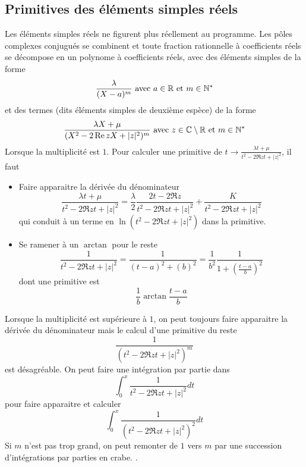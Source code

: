 \subsection{Primitives des éléments simples réels}
Les éléments simples réels ne figurent plus réellement au programme. Les pôles complexes conjugués se combinent et toute fraction rationnelle à coefficients réels se décompose en un polynome à coefficients réels, avec des éléments simples de la forme
\begin{displaymath}
 \frac{\lambda}{(X-a)^m} \text{ avec } a\in \mathbb{R} \text{ et } m\in \mathbb{N}^*
\end{displaymath}
et des termes (dits éléments simples de deuxième espèce) de la forme
\begin{displaymath}
 \frac{\lambda X + \mu }{(X^2-2\mathop{\mathrm{Re}} z X +|z|^2)^m} \text{ avec } z\in\mathbb{C}\setminus \mathbb{R} \text{ et } m\in \mathbb{N}^*
\end{displaymath}
Lorsque la multiplicité est $1$. Pour calculer une primitive de $t\rightarrow \frac{\lambda t + \mu }{t^2-2\Re z t +|z|^2}$, il faut
\begin{itemize}
 \item Faire apparaitre la dérivée du dénominateur
\begin{displaymath}
 \frac{\lambda t + \mu }{t^2-2\Re z t +|z|^2} 
= \frac{\lambda}{2} \frac{2 t -2\Re z }{t^2-2\Re z t +|z|^2}
  + \frac{K }{t^2-2\Re z t +|z|^2} 
\end{displaymath}
qui conduit à un terme en $\ln(t^2-2\Re z t +|z|^2)$ dans la primitive.
\item Se ramener à un $\arctan$ pour le reste 
\begin{displaymath}
 \frac{1}{t^2-2\Re z t +|z|^2} = \frac{1 }{(t-a)^2 +(b)^2}
=\frac{1}{b^2} \frac{1 }{1+ \left( \frac{t-a}{b}\right) ^2}
\end{displaymath}
dont une primitive est
\begin{displaymath}
 \frac{1}{b}\arctan \frac{t-a}{b}
\end{displaymath}
\end{itemize}
Lorsque la multiplicité est supérieure à $1$, on peut toujours faire apparaitre la dérivée du dénominateur mais le calcul d'une primitive du reste
\begin{displaymath}
 \frac{1 }{(t^2-2\Re z t +|z|^2)^m}
\end{displaymath}
est désagréable. On peut faire une intégration par partie dans 
\begin{displaymath}
 \int_0^x \frac{1 }{t^2-2\Re z t +|z|^2}dt
\end{displaymath}
pour faire apparaitre et calculer
\begin{displaymath}
 \int_0^x \frac{1 }{(t^2-2\Re z t +|z|^2)^2}dt
\end{displaymath}
Si $m$ n'est pas trop grand, on peut remonter de $1$ vers $m$ par une succession d'intégrations par parties \og en crabe\fg. .

